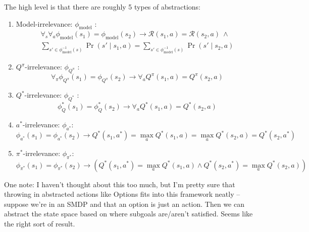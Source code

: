 \documentclass[11pt]{amsart}
\begin{document}
The high level is that there are roughly 5 types of abstractions:
\begin{enumerate}
\item Model-irrelevance: $\phi_{\text{model}}$ :
\begin{multline*}
\forall_s \forall_a \phi_{\text{model}}(s_1) = \phi_{\text{model}}(s_2) \rightarrow \mathcal{R}(s_1,a) = \mathcal{R}(s_2,a)\ \wedge \\
\sum_{s' \in \phi_{\text{model}}^{-1}(s)} \Pr(s' \mid s_1, a) = \sum_{s' \in \phi_{\text{model}}^{-1}(s)} \Pr(s' \mid s_2, a)
\end{multline*}

\item $Q^\pi$-irrelevance: $\phi_{Q^\pi}$ :
\begin{equation*}
\forall_\pi \phi_{Q^\pi}(s_1) = \phi_{Q^\pi}(s_2) \rightarrow  \forall_a Q^\pi(s_1,a) = Q^\pi(s_2,a)
\end{equation*}

\item $Q^*$-irrelevance: $\phi_{Q^*}$ :
\begin{equation*}
\phi_Q^*(s_1) = \phi_Q^*(s_2) \rightarrow \forall_a  Q^*(s_1,a) = Q^*(s_2,a)
\end{equation*}

\item $a^*$-irrelevance: $\phi_{a^*}$:
\begin{equation*}
\phi_{a^*}(s_1) = \phi_{a^*}(s_2) \rightarrow Q^*(s_1,a^*) = \max_a Q^*(s_1,a) = \max_a Q^*(s_2,a) = Q^*(s_2, a^*)
\end{equation*}

\item $\pi^*$-irrelevance: $\phi_{\pi^*}$:
\begin{equation*}
\phi_{\pi^*}(s_1) = \phi_{\pi^*}(s_2) \rightarrow \left( Q^*(s_1, a^*) = \max_a Q^*(s_1,a) \wedge Q^*(s_2,a^*) = \max_a Q^*(s_2,a) \right)
\end{equation*}

\end{enumerate}

One note: I haven't thought about this too much, but I'm pretty sure that throwing in abstracted actions like Options fits into this framework neatly -- suppose we're in an SMDP and that an option is just an action. Then we can abstract the state space based on where subgoals are/aren't satisfied. Seems like the right sort of result.
\end{document}
